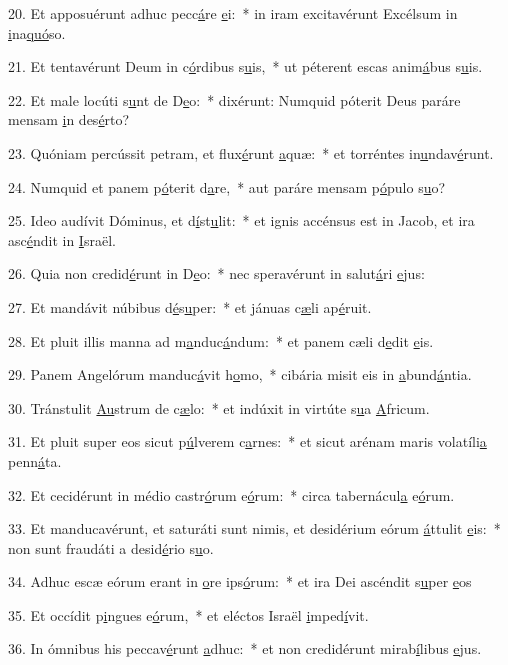 20. Et apposuérunt adhuc pecc\uline{á}re \uline{e}i:~* in iram excitavérunt Excélsum in \uline{i}na\uline{quó}so.\par 
21. Et tentavérunt Deum in c\uline{ó}rdibus s\uline{u}is,~* ut péterent escas anim\uline{á}bus s\uline{u}is.\par 
22. Et male locúti s\uline{u}nt de D\uline{e}o:~* dixérunt: Numquid póterit Deus paráre mensam \uline{i}n des\uline{é}rto?\par 
23. Quóniam percússit petram, et flux\uline{é}runt \uline{a}quæ:~* et torréntes in\uline{u}ndav\uline{é}runt.\par 
24. Numquid et panem p\uline{ó}terit d\uline{a}re,~* aut paráre mensam p\uline{ó}pulo s\uline{u}o?\par 
25. Ideo audívit Dóminus, et d\uline{í}st\uline{u}lit:~* et ignis accénsus est in Jacob, et ira asc\uline{é}ndit in \uline{I}sraël.\par 
26. Quia non credid\uline{é}runt in D\uline{e}o:~* nec speravérunt in salut\uline{á}ri \uline{e}jus:\par 
27. Et mandávit núbibus d\uline{é}s\uline{u}per:~* et jánuas c\uline{æ}li ap\uline{é}ruit.\par 
28. Et pluit illis manna ad m\uline{a}nduc\uline{á}ndum:~* et panem cæli d\uline{e}dit \uline{e}is.\par 
29. Panem Angelórum manduc\uline{á}vit h\uline{o}mo,~* cibária misit eis in \uline{a}bund\uline{á}ntia.\par 
30. Tránstulit \uline{Au}strum de c\uline{æ}lo:~* et indúxit in virtúte s\uline{u}a \uline{A}fricum.\par 
31. Et pluit super eos sicut p\uline{ú}lverem c\uline{a}rnes:~* et sicut arénam maris volatíli\uline{a} penn\uline{á}ta.\par 
32. Et cecidérunt in médio castr\uline{ó}rum e\uline{ó}rum:~* circa tabernácul\uline{a} e\uline{ó}rum.\par 
33. Et manducavérunt, et saturáti sunt nimis, et desidérium eórum \uline{á}ttulit \uline{e}is:~* non sunt fraudáti a desid\uline{é}rio s\uline{u}o.\par 
34. Adhuc escæ eórum erant in \uline{o}re ips\uline{ó}rum:~* et ira Dei ascéndit s\uline{u}per \uline{e}os\par 
35. Et occídit p\uline{i}ngues e\uline{ó}rum,~* et eléctos Israël \uline{i}mped\uline{í}vit.\par 
36. In ómnibus his peccav\uline{é}runt \uline{a}dhuc:~* et non credidérunt mirab\uline{í}libus \uline{e}jus.\par 
